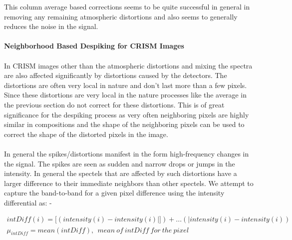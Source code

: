 \documentclass[pdftex, 12pt,a4paper,oneside]{report}
\begin{document}
This column average based corrections seems to be quite successful in general in removing any remaining atmospheric distortions and also seems to generally reduces the noise in the signal.\\
\\
\textbf{Neighborhood Based Despiking for CRISM Images}\\
\\In CRISM images other than the atmospheric distortions and mixing the spectra are also affected significantly by distortions caused by the detectors. The distortions are often very local in nature and don't last more than a few pixels. Since these distortions are very local in the nature processes like the average in the previous section do not correct for these distortions. This is of great significance for the despiking process as very often neighboring pixels are highly similar in compositions and the shape of the neighboring pixels can be used to correct the shape of the distorted pixels in the image.\\ 
\\
In general the spikes/distortions manifest in the form high-frequency changes in the signal. The spikes are seen as sudden and narrow drops or jumps in the intensity. In general the spectels that are affected by such distortions have a larger difference to their immediate neighbors than other spectels. We attempt to capture the band-to-band for a given pixel difference using the intensity differential as: -

\begin{multline}
intDiff(i) = [(intensity(i) - intensity(i)|]) + ... (|intensity(i) - intensity(i))\\
\mu_{intDiff} = mean(intDiff), ~~mean~of~intDiff~for~the~pixel
\end{multline}
\end{document}
